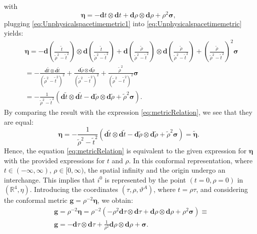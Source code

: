 with
\begin{equation}\label{eq:Unphysicalspacetimemetric1}
  \boldsymbol{\eta}=-\mathbf{d} t \otimes \mathbf{d} t+\mathbf{d} \rho \otimes \mathbf{d} \rho+\rho^2 \boldsymbol{\sigma},
\end{equation}
plugging \eqref{eq:Unphysicalspacetimemetric1} into \eqref{eq:Unphysicalspacetimemetric} yields:
\begin{align}\label{eq:Unphysicalspacetimemetric2}
  & \boldsymbol{\eta} = -\mathbf{d} \left(\frac{\tilde{t}}{\tilde{\rho}^2-\tilde{t}^2}\right) \otimes \mathbf{d} \left(\frac{\tilde{t}}{\tilde{\rho}^2-\tilde{t}^2}\right) + \mathbf{d} \left(\frac{\tilde{\rho}}{\tilde{\rho}^2-\tilde{t}^2}\right) \otimes \mathbf{d} \left(\frac{\tilde{\rho}}{\tilde{\rho}^2-\tilde{t}^2}\right) + \left(\frac{\tilde{\rho}}{\tilde{\rho}^2-\tilde{t}^2}\right)^2 \boldsymbol{\sigma} \nonumber \\
  & = -\frac{\mathbf{d} \tilde{t} \otimes \mathbf{d} \tilde{t}}{(\tilde{\rho}^2-\tilde{t}^2)^2}+\frac{\mathbf{d} \tilde{\rho} \otimes \mathbf{d} \tilde{\rho}}{(\tilde{\rho}^2-\tilde{t}^2)^2}+\frac{\tilde{\rho}^2}{(\tilde{\rho}^2-\tilde{t}^2)^2} \boldsymbol{\sigma} \nonumber \\
  & = -\frac{1}{\tilde{\rho}^2-\tilde{t}^2} (\mathbf{d} \tilde{t} \otimes \mathbf{d} \tilde{t}-\mathbf{d} \tilde{\rho} \otimes \mathbf{d} \tilde{\rho}+\tilde{\rho}^2 \boldsymbol{\sigma}).
\end{align}
By comparing the result with the expression \eqref{eq:metricRelation}, we see that they are equal:
\begin{equation}\label{eq:UnphysicalMetricFinal}
  \boldsymbol{\eta} = -\frac{1}{\tilde{\rho}^2-\tilde{t}^2} (\mathbf{d} \tilde{t} \otimes \mathbf{d} \tilde{t}-\mathbf{d} \tilde{\rho} \otimes \mathbf{d} \tilde{\rho}+\tilde{\rho}^2 \boldsymbol{\sigma}) = \boldsymbol{\tilde{\eta}}.
\end{equation}
Hence, the equation \eqref{eq:metricRelation} is equivalent to the given expression for \(\boldsymbol{\eta}\) with the provided expressions for \(t\) and \(\rho\).
In this conformal representation, where $t \in (-\infty, \infty)$, $\rho \in [0, \infty)$, the spatial infinity and the origin undergo an interchange. This implies that $i^0$ is represented by the point $(t = 0, \rho = 0)$ in $(\mathbb{R}^4, \eta)$. Introducing the coordinates $(\tau, \rho, \vartheta^A)$, where $t = \rho \tau$, and considering the conformal metric $\boldsymbol{g} = \rho^{-2} \boldsymbol{\eta}$, we obtain:
\begin{align}\label{eq:unphysicalmetricMink}
  & \boldsymbol{g} = \rho^{-2} \boldsymbol{\eta} = \rho^{-2}(-\rho^{2}\mathbf{d} \tau \otimes \mathbf{d} \tau + \mathbf{d} \rho \otimes \mathbf{d} \rho + \rho^2 \boldsymbol{\sigma}) \equiv \nonumber \\
  & \boldsymbol{g} = -\mathbf{d} \tau \otimes \mathbf{d} \tau + \frac{1}{\rho^2} \mathbf{d} \rho \otimes \mathbf{d} \rho + \boldsymbol{\sigma}.
\end{align}
